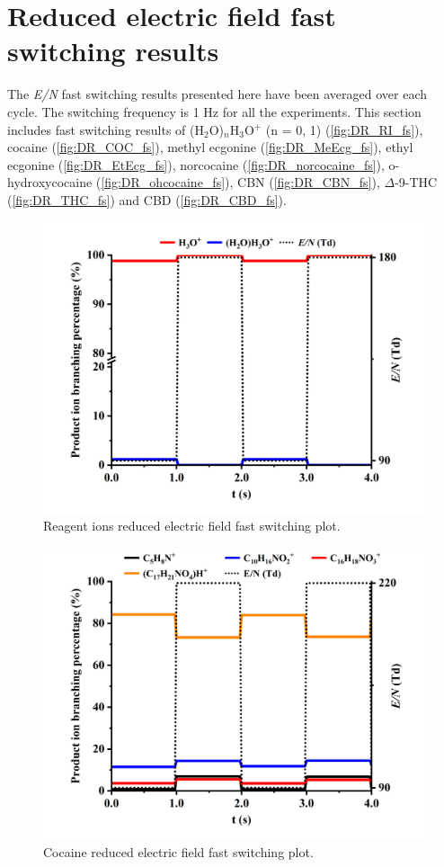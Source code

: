 \section{Reduced electric field fast switching results}
The \textit{E/N} fast switching results presented here have been averaged over each cycle.
%
The switching frequency is 1 Hz for all the experiments.
%
%
This section includes fast switching results of 
(H$_2$O)$_n$H$_3$O$^+$ (n = 0, 1) (\autoref{fig:DR_RI_fs}), 
cocaine (\autoref{fig:DR_COC_fs}),
methyl ecgonine (\autoref{fig:DR_MeEcg_fs}),
ethyl ecgonine (\autoref{fig:DR_EtEcg_fs}),
norcocaine (\autoref{fig:DR_norcocaine_fs}),
o-hydroxycocaine (\autoref{fig:DR_ohcocaine_fs}),
CBN (\autoref{fig:DR_CBN_fs}),
$\Delta$-9-THC (\autoref{fig:DR_THC_fs})
and
CBD (\autoref{fig:DR_CBD_fs}).



\begin{figure}[htb]
\centering
\includegraphics[width=0.80\linewidth]{pics/RIDPM90180Td-averaged.png}
\caption{Reagent ions reduced electric field fast switching plot.}
\label{fig:DR_RI_fs}
\end{figure}


\begin{figure}[htb]
\centering
\includegraphics[width=0.80\linewidth]{pics/other_drugs/coc-fs-90-220.png}
\caption{Cocaine reduced electric field fast switching plot.}
\label{fig:DR_COC_fs}
\end{figure}



